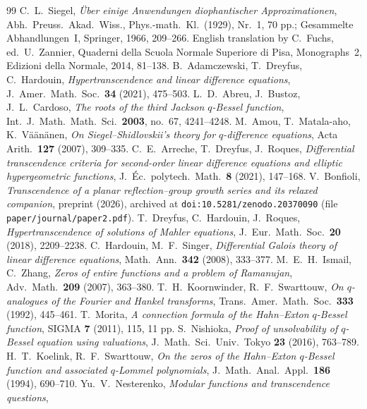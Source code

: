\documentclass[11pt]{article}
\theoremstyle{plain}
\theoremstyle{definition}
\theoremstyle{remark}
\begin{document}
\begin{thebibliography}{99}
 C.~L.~Siegel, \emph{\"Uber einige Anwendungen diophantischer Approximationen},
Abh.\ Preuss.\ Akad.\ Wiss., Phys.-math.\ Kl.\ (1929), Nr.~1, 70 pp.; Gesammelte Abhandlungen~I,
Springer, 1966, 209--266. English translation by C.~Fuchs, ed.\ U.~Zannier, Quaderni della Scuola
Normale Superiore di Pisa, Monographs~2, Edizioni della Normale, 2014, 81--138.
 B.~Adamczewski, T.~Dreyfus, C.~Hardouin, \emph{Hypertranscendence and linear
difference equations}, J.~Amer.\ Math.\ Soc.\ \textbf{34} (2021), 475--503.
 L.~D.~Abreu, J.~Bustoz, J.~L.~Cardoso, \emph{The roots of the third Jackson
$q$-Bessel function}, Int.\ J.\ Math.\ Math.\ Sci.\ \textbf{2003}, no.~67, 4241--4248.
 M.~Amou, T.~Matala-aho, K.~V\"a\"an\"anen, \emph{On Siegel--Shidlovskii's theory for
$q$-difference equations}, Acta Arith.\ \textbf{127} (2007), 309--335.
 C.~E.~Arreche, T.~Dreyfus, J.~Roques, \emph{Differential transcendence criteria for
second-order linear difference equations and elliptic hypergeometric functions}, J.~\'Ec.\ polytech.\
Math.\ \textbf{8} (2021), 147--168.
 V.~Bonfioli, \emph{Transcendence of a planar reflection--group growth series and
its relaxed companion}, preprint (2026), archived at \texttt{doi:10.5281/zenodo.20370090}
(file \texttt{paper/journal/paper2.pdf}).
 T.~Dreyfus, C.~Hardouin, J.~Roques, \emph{Hypertranscendence of solutions of Mahler
equations}, J.~Eur.\ Math.\ Soc.\ \textbf{20} (2018), 2209--2238.
\bibitem{HS} C.~Hardouin, M.~F.~Singer, \emph{Differential Galois theory of linear difference
equations}, Math.\ Ann.\ \textbf{342} (2008), 333--377.
 M.~E.~H.~Ismail, C.~Zhang, \emph{Zeros of entire functions and a problem
of Ramanujan}, Adv.\ Math.\ \textbf{209} (2007), 363--380.
 T.~H.~Koornwinder, R.~F.~Swarttouw, \emph{On $q$-analogues of the Fourier and Hankel
transforms}, Trans.\ Amer.\ Math.\ Soc.\ \textbf{333} (1992), 445--461.
\bibitem{Morita2011} T.~Morita, \emph{A connection formula of the Hahn--Exton $q$-Bessel function},
SIGMA \textbf{7} (2011), 115, 11 pp.
 S.~Nishioka, \emph{Proof of unsolvability of $q$-Bessel equation using
valuations}, J.~Math.\ Sci.\ Univ.\ Tokyo \textbf{23} (2016), 763--789.
\bibitem{KS} H.~T.~Koelink, R.~F.~Swarttouw, \emph{On the zeros of the Hahn--Exton $q$-Bessel function
and associated $q$-Lommel polynomials}, J.\ Math.\ Anal.\ Appl.\ \textbf{186} (1994), 690--710.
\bibitem{Nesterenko} Yu.~V.~Nesterenko, \emph{Modular functions and transcendence questions},

\end{thebibliography}
\end{document}
